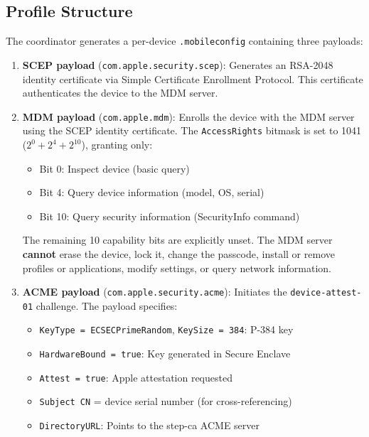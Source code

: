 \documentclass[10pt,twocolumn,letterpaper]{article}
\begin{document}
\subsection{Profile Structure}

The coordinator generates a per-device \texttt{.mobileconfig} containing three payloads:

\begin{enumerate}[leftmargin=*,itemsep=2pt]
    \item \textbf{SCEP payload} (\texttt{com.apple.security.scep}): Generates an RSA-2048 identity certificate via Simple Certificate Enrollment Protocol. This certificate authenticates the device to the MDM server.

    \item \textbf{MDM payload} (\texttt{com.apple.mdm}): Enrolls the device with the MDM server using the SCEP identity certificate. The \texttt{AccessRights} bitmask is set to 1041 ($2^0 + 2^4 + 2^{10}$), granting only:
    \begin{itemize}[leftmargin=*,itemsep=0pt]
        \item Bit 0: Inspect device (basic query)
        \item Bit 4: Query device information (model, OS, serial)
        \item Bit 10: Query security information (SecurityInfo command)
    \end{itemize}
    The remaining 10 capability bits are explicitly unset. The MDM server \textbf{cannot} erase the device, lock it, change the passcode, install or remove profiles or applications, modify settings, or query network information.

    \item \textbf{ACME payload} (\texttt{com.apple.security.acme}): Initiates the \texttt{device-attest-01} challenge. The payload specifies:
    \begin{itemize}[leftmargin=*,itemsep=0pt]
        \item \texttt{KeyType = ECSECPrimeRandom}, \texttt{KeySize = 384}: P-384 key
        \item \texttt{HardwareBound = true}: Key generated in Secure Enclave
        \item \texttt{Attest = true}: Apple attestation requested
        \item \texttt{Subject CN} = device serial number (for cross-referencing)
        \item \texttt{DirectoryURL}: Points to the step-ca ACME server
    \end{itemize}
\end{enumerate}
\end{document}
